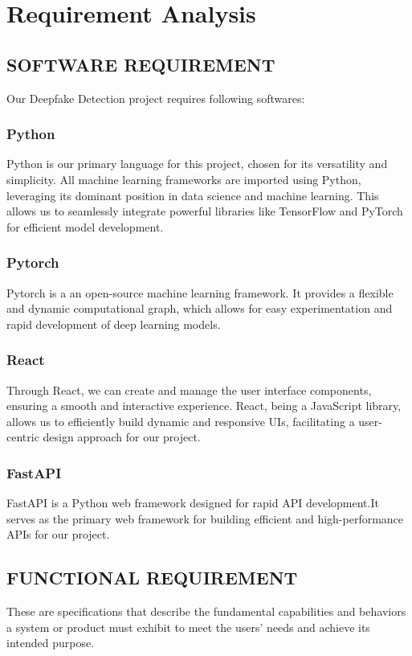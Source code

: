       \chapter{Requirement Analysis}
        \section{SOFTWARE REQUIREMENT}
            Our Deepfake Detection project requires following softwares:
            \subsection*{Python} 
            Python is our primary language for this project, chosen for its versatility and simplicity. All machine learning frameworks are imported using
            Python, leveraging its dominant position in data science and machine learning. This allows us to seamlessly integrate powerful libraries like TensorFlow and PyTorch for efficient model development.

            \subsection*{Pytorch}
            Pytorch is a an open-source machine learning framework. It provides a flexible and dynamic computational graph, which allows for easy experimentation and rapid development of deep learning models. 

            \subsection*{React}
            Through React, we can create and manage the user interface components, ensuring a smooth and interactive experience. React, being a JavaScript library, allows us to efficiently build dynamic and responsive UIs, facilitating a user-centric design approach for our project.

            \subsection*{FastAPI}
            FastAPI is a Python web framework designed for rapid API development.It serves as the primary web framework for building efficient and high-performance APIs for our project.
                
        \section{FUNCTIONAL REQUIREMENT}
            These are specifications that describe the fundamental capabilities and behaviors a system or product must exhibit to meet the users' needs and achieve its intended purpose. 


